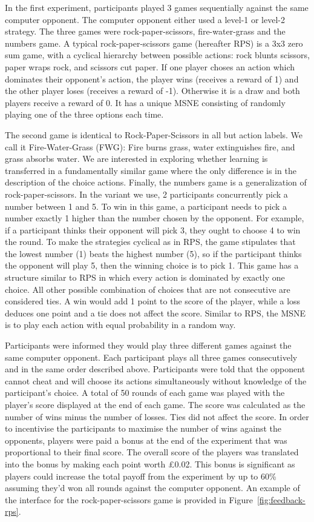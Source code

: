\documentclass[man,floatsintext]{apa6}
\begin{document}
In the first experiment, participants played 3 games sequentially against the same computer opponent. The computer opponent either used a level-1 or level-2 strategy. The three games were rock-paper-scissors, fire-water-grass and the numbers game. A typical rock-paper-scissors game (hereafter RPS) is a 3x3 zero sum game, with a cyclical hierarchy between possible actions: rock blunts scissors, paper wraps rock, and scissors cut paper. If one player choses an action which dominates their opponent's action, the player wins (receives a reward of 1) and the other player loses (receives a reward of -1). Otherwise it is a draw and both players receive a reward of 0. It has a unique MSNE consisting of randomly playing one of the three options each time.

The second game is identical to Rock-Paper-Scissors in all but action labels. We call it Fire-Water-Grass (FWG): Fire burns grass, water extinguishes fire, and grass absorbs water. We are interested in exploring whether learning is transferred in a fundamentally similar game where the only difference is in the description of the choice actions. Finally, the numbers game is a generalization of rock-paper-scissors. In the variant we use, 2 participants concurrently pick a number between 1 and 5. To win in this game, a participant needs to pick a number exactly 1 higher than the number chosen by the opponent. For example, if a participant thinks their opponent will pick 3, they ought to choose 4 to win the round. To make the strategies cyclical as in RPS, the game stipulates that the lowest number (1) beats the highest number (5), so if the participant thinks the opponent will play 5, then the winning choice is to pick 1. This game has a structure similar to RPS in which every action is dominated by exactly one choice. All other possible combination of choices that are not consecutive are considered ties. A win would add 1 point to the score of the player, while a loss deduces one point and a tie does not affect the score. Similar to RPS, the MSNE is to play each action with equal probability in a random way.

Participants were informed they would play three different games against the same computer opponent. Each participant plays all three games consecutively and in the same order described above. Participants were told that the opponent cannot cheat and will choose its actions simultaneously without knowledge of the participant's choice. A total of 50 rounds of each game was played with the player's score displayed at the end of each game. The score was calculated as the number of wins minus the number of losses. Ties did not affect the score. In order to incentivise the participants to maximise the number of wins against the opponents, players were paid a bonus at the end of the experiment that was proportional to their final score. The overall score of the players was translated into the bonus by making each point worth £0.02. This bonus is significant as players could increase the total payoff from the experiment by up to 60\% assuming they'd won all rounds against the computer opponent. An example of the interface for the rock-paper-scissors game is provided in Figure~\ref{fig:feedback-rps}.
\end{document}
